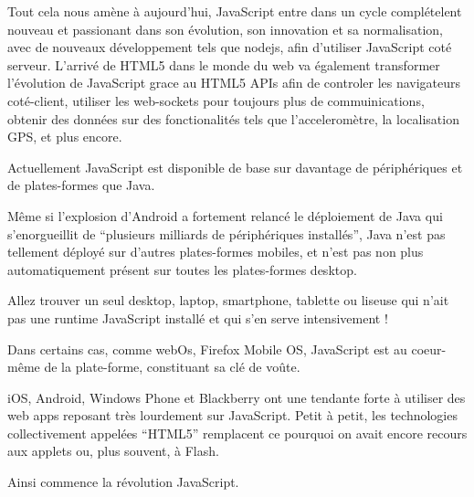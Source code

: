 Tout cela nous amène à aujourd’hui, JavaScript entre dans un cycle complételent nouveau et passionant dans son évolution, son innovation et sa normalisation, avec de nouveaux développement tels que nodejs, afin d’utiliser JavaScript coté serveur. L’arrivé de HTML5 dans le monde du web va également transformer l’évolution de JavaScript grace au HTML5 APIs afin de controler les navigateurs coté-client, utiliser les web-sockets pour toujours plus de commuinications, obtenir des données sur des fonctionalités tels que l’acceleromètre, la localisation GPS, et plus encore.

Actuellement JavaScript est disponible de base sur davantage de périphériques et de plates-formes que Java.

Même si l’explosion d’Android a fortement relancé le déploiement de Java qui s’enorgueillit de “plusieurs milliards de périphériques installés”, Java n’est pas tellement déployé sur d’autres plates-formes mobiles, et n’est pas non plus automatiquement présent sur toutes les plates-formes desktop.

Allez trouver un seul desktop, laptop, smartphone, tablette ou liseuse qui n’ait pas une runtime JavaScript installé et qui s’en serve intensivement !

Dans certains cas, comme webOs, Firefox Mobile OS, JavaScript est au coeur-même de la plate-forme, constituant sa clé de voûte.

iOS, Android, Windows Phone et Blackberry ont une tendante forte à utiliser des web apps reposant très lourdement sur JavaScript. Petit à petit, les technologies collectivement appelées “HTML5” remplacent ce pourquoi on avait encore recours aux applets ou, plus souvent, à Flash.

Ainsi commence la révolution JavaScript.




